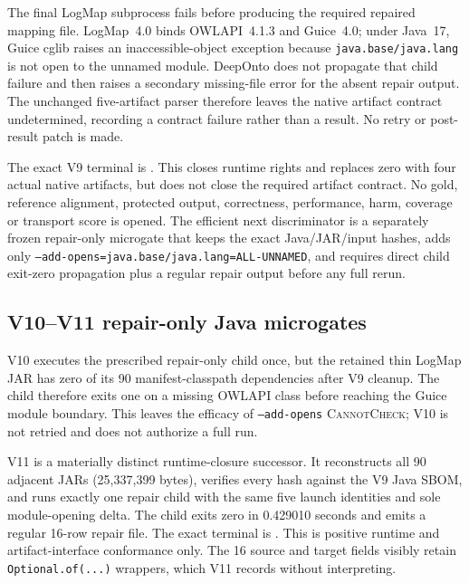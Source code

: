 The final LogMap subprocess fails before producing the required repaired
mapping file. LogMap~4.0 binds OWLAPI~4.1.3 and Guice~4.0;
under Java~17, Guice cglib raises an inaccessible-object exception because
\texttt{java.base/}\allowbreak\texttt{java.lang} is
not open to the unnamed module. DeepOnto does not propagate that child failure
and then raises a secondary missing-file error for the absent repair
output. The unchanged five-artifact parser therefore leaves the native artifact contract undetermined, recording a contract failure rather than a result. No retry or post-result
patch is made.

The exact V9 terminal is
.
This closes runtime rights and replaces zero with four actual native artifacts,
but does not close the required artifact contract. No gold, reference alignment,
protected output, correctness, performance, harm, coverage or transport score is
opened. The efficient next discriminator is a separately frozen repair-only
microgate that keeps the exact Java/JAR/input hashes, adds only
\texttt{--add-opens=java.base/java.lang=ALL-UNNAMED}, and requires direct child
exit-zero propagation plus a regular repair output before any full rerun.

\subsection{V10--V11 repair-only Java microgates}

V10 executes the prescribed repair-only child once, but the retained thin
LogMap JAR has zero of its 90 manifest-classpath dependencies after V9 cleanup.
The child therefore exits one on a missing OWLAPI class before reaching the
Guice module boundary. This leaves the efficacy of \texttt{--add-opens}
\textsc{CannotCheck}; V10 is not retried and does not authorize a full run.

V11 is a materially distinct runtime-closure successor. It reconstructs all
90 adjacent JARs (25,337,399 bytes), verifies every hash against the V9 Java
SBOM, and runs exactly one repair child with the same five launch identities
and sole module-opening delta. The child exits zero in 0.429010 seconds and
emits a regular 16-row repair file. The exact terminal is
.
This is positive runtime and artifact-interface conformance only. The 16 source
and target fields visibly retain \texttt{Optional.of(...)} wrappers, which V11
records without interpreting.


